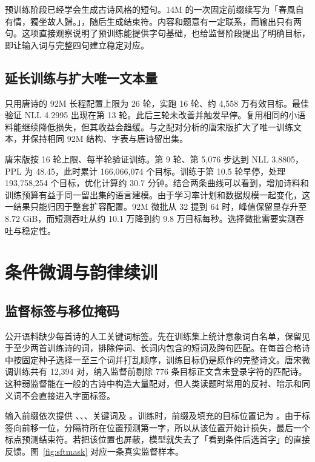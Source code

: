 预训练阶段已经学会生成古诗风格的短句。14M 的一次固定前缀续写为「{\versefont 春風自有情，獨坐故人歸。}」，随后生成结束符。内容和题意有一定联系，而输出只有两句。这项直接观察说明了预训练能提供字句基础，也给监督阶段提出了明确目标，即让输入词与完整四句建立稳定对应。

\subsection{延长训练与扩大唯一文本量}

只用唐诗的 92M 长程配置上限为 26 轮，实跑 16 轮、约 4,558 万有效目标。最佳验证 NLL 4.2995 出现在第 13 轮。此后三轮未改善并触发早停。复用相同的小语料能继续降低损失，但其收益会趋缓。与之配对分析的唐宋版扩大了唯一训练文本，并保持相同 92M 结构、字表与唐诗留出集。


唐宋版按 16 轮上限、每半轮验证训练。第 9 轮、第 5,076 步达到 NLL 3.8805，PPL 为 48.45，此时累计 166,066,074 个目标。训练于第 10.5 轮早停，处理 193,758,254 个目标，优化计算约 30.7 分钟。结合两条曲线可以看到，增加诗料和训练预算有益于同一留出集的语言建模。由于学习率计划和数据规模一起变化，这一结果只能归因于整套扩容配置。92M 微批从 32 提到 64 时，峰值保留显存升至 8.72 GiB，而短测吞吐从约 10.1 万降到约 9.8 万目标每秒。选择微批需要实测吞吐与稳定性。

\section{条件微调与韵律续训}
\label{sec:sft}

\subsection{监督标签与移位掩码}

公开语料缺少每首诗的人工关键词标签。先在训练集上统计意象词白名单，保留见于至少两首训练诗的词，排除停词、长词内包含的短词及跨句匹配。在每首合格诗中按固定种子选择一至三个词并打乱顺序，训练目标仍是原作的完整诗文。唐宋微调训练共有 12,394 对，纳入监督前剔除 776 条目标正文含未登录字符的匹配诗。这种弱监督能在一般的古诗中构造大量配对，但人类读题时常用的反衬、暗示和同义词不会直接进入字面标签。

输入前缀依次提供 、、、关键词及 。训练时，前缀及填充的目标位置记为 。由于标签向前移一位，分隔符所在位置预测第一字，所以从该位置开始计损失，最后一个标点预测结束符。若把该位置也屏蔽，模型就失去了「看到条件后选首字」的直接反馈。图~\ref{fig:sftmask} 对应一条真实监督样本。

